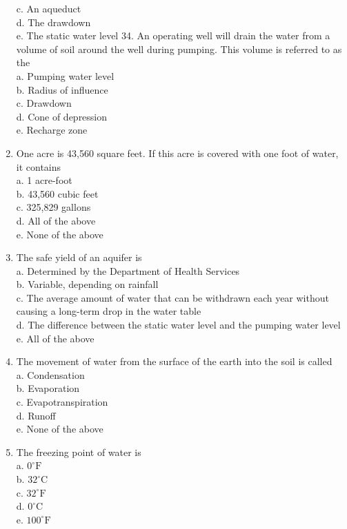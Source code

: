 \begin{enumerate}
c. An aqueduct\\
d. The drawdown\\
e. The static water level 34. An operating well will drain the water from a volume of soil around the well during pumping. This volume is referred to as the\\
a. Pumping water level\\
b. Radius of influence\\
c. Drawdown\\
d. Cone of depression\\
e. Recharge zone\\
\item One acre is 43,560 square feet. If this acre is covered with one foot of water, it contains\\
a. 1 acre-foot\\
b. 43,560 cubic feet\\
c. 325,829 gallons\\
d. All of the above\\
e. None of the above\\
\item The safe yield of an aquifer is\\
a. Determined by the Department of Health Services\\
b. Variable, depending on rainfall\\
c. The average amount of water that can be withdrawn each year without causing a long-term drop in the water table\\
d. The difference between the static water level and the pumping water level\\
e. All of the above\\

\item The movement of water from the surface of the earth into the soil is called\\
a. Condensation\\
b. Evaporation\\
c. Evapotranspiration\\
d. Runoff\\
e. None of the above\\

\item The freezing point of water is\\
a. $0^{\circ} \mathrm{F}$\\
b. $32^{\circ} \mathrm{C}$\\
c. $32^{\circ} \mathrm{F}$\\
d. $0^{\circ} \mathrm{C}$\\
e. $100^{\circ} \mathrm{F}$\\


\end{enumerate}
